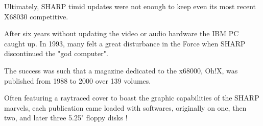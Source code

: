 Ultimately, SHARP timid updates were not enough to keep even its most recent X68030 competitive. 

After six years without updating the video or audio hardware the IBM PC caught up. In 1993, many felt a great disturbance in the Force when SHARP discontinued the "god computer".

\begin{trivia}
The success was such that a magazine dedicated to the x68000, Oh!X, was published from 1988 to 2000 over 139 volumes. 

\begin{minipage}[t]{0.32\linewidth}
\end{minipage}%
\hfill
\begin{minipage}[t]{0.32\linewidth}
\end{minipage}%
\hfill
\begin{minipage}[t]{0.322\linewidth}
\end{minipage}%

Often featuring a raytraced cover to boast the graphic capabilities of the SHARP marvels, each publication came loaded with softwares, originally on one, then two, and later three 5.25" floppy disks \cite{ohXarticle}!
\end{trivia}